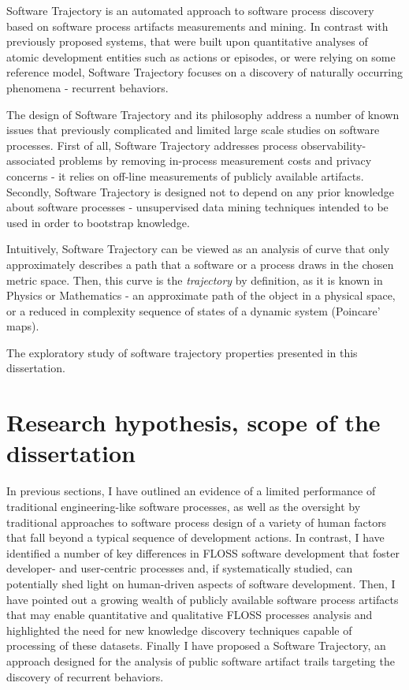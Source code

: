 Software Trajectory is an automated approach to software process discovery based on software process artifacts 
measurements and mining. In contrast with previously proposed systems, that were built upon quantitative analyses
of atomic development entities such as actions or episodes, or were relying on some reference model, 
Software Trajectory focuses on a discovery of naturally occurring phenomena - recurrent behaviors. 

The design of Software Trajectory and its philosophy address a number of known issues that previously complicated 
and limited large scale studies on software processes.
First of all, Software Trajectory addresses process observability-associated problems by removing in-process 
measurement costs and privacy concerns - it relies on off-line measurements of publicly available artifacts. 
Secondly, Software Trajectory is designed not to depend on any prior knowledge about software processes - 
unsupervised data mining techniques intended to be used in order to bootstrap knowledge. 

Intuitively, Software Trajectory can be viewed as an analysis of curve that only approximately describes 
a path that a software or a process draws in the chosen metric space. 
Then, this curve is the \textit{trajectory} by definition, as it is known in Physics or Mathematics - an approximate 
path of the object in a physical space, or a reduced in complexity sequence of states of a dynamic system 
(Poincare' maps).

The exploratory study of software trajectory properties presented in this dissertation.

%
%
\section{Research hypothesis, scope of the dissertation}\label{sec_research_hypothesis}
In previous sections, I have outlined an evidence of a limited performance of traditional engineering-like 
software processes, as well as the oversight by traditional approaches to software process 
design of a variety of human factors that fall beyond a typical sequence of development actions.
In contrast, I have identified a number of key differences in FLOSS software development that foster 
developer- and user-centric processes and, if systematically studied, can potentially shed light on 
human-driven aspects of software development. 
Then, I have pointed out a growing wealth of publicly available software process artifacts that may 
enable quantitative and qualitative FLOSS processes analysis and highlighted the need for new 
knowledge discovery techniques capable of processing of these datasets.
Finally I have proposed a Software Trajectory, an approach designed for the analysis of public 
software artifact trails targeting the discovery of recurrent behaviors.

